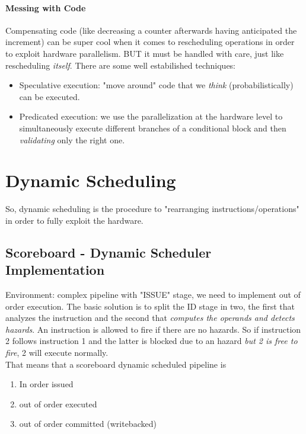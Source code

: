 \documentclass[10pt,a4paper]{article}
\begin{document}
					\paragraph{Messing with Code}
						Compensating code (like decreasing a counter afterwards having anticipated the increment) can be super cool when it comes to rescheduling operations in order to exploit hardware parallelism. BUT it must be handled with care, just like rescheduling \emph{itself}. There are some well estabilished techniques:
						\begin{itemize}
							\item Speculative execution: "move around" code that we \emph{think} (probabilistically) can be executed.
							\item Predicated execution: we use the parallelization at the hardware level to simultaneously execute different branches of a conditional block and then \emph{validating} only the right one.
						\end{itemize}
						
		\section{Dynamic Scheduling}
			So, dynamic scheduling is the procedure to "rearranging instructions/operations" in order to fully exploit the hardware.
			
			\subsection{Scoreboard - Dynamic Scheduler Implementation}
				Environment: complex pipeline with "ISSUE" stage, we need to implement out of order execution. The basic solution is to split the ID stage in two, the first that analyzes the instruction and the second that \emph{computes the operands and detects hazards}. An instruction is allowed to fire if there are no hazards. So if instruction 2 follows instruction 1 and the latter is blocked due to an hazard \emph{but 2 is free to fire}, 2 will execute normally.\\
				That means that a scoreboard dynamic scheduled pipeline is
				\begin{enumerate}
					\item In order issued
					\item out of order executed
					\item out of order committed (writebacked)
				\end{enumerate}
				
\end{document}
